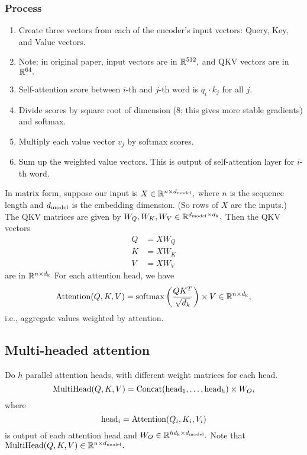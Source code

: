 \subsubsection{Process}
\begin{enumerate}
\item Create three vectors from each of the encoder’s input vectors: Query, Key, and Value vectors.

\item Note: in original paper, input vectors are in $\mathbb{R}^{512},$ and QKV vectors are in $\mathbb{R}^{64}.$

\item Self-attention score between $i$-th and $j$-th word is $q_i \cdot k_j$ for all $j.$

\item Divide scores by square root of dimension (8; this gives more stable gradients) and softmax.

\item Multiply each value vector $v_j$ by softmax scores.

\item Sum up the weighted value vectors. This is output of self-attention layer for $i$-th word.
\end{enumerate}
In matrix form, suppose our input is $X \in \mathbb{R}^{n \times d_{\mathrm{model}}},$ where $n$ is the sequence length and $d_{\mathrm{model}}$ is the embedding dimension. (So rows of $X$ are the inputs.) The QKV matrices are given by $W_Q, W_K, W_V \in \mathbb{R}^{d_{\mathrm{model}} \times d_{\mathrm{k}}}.$ Then the QKV vectors
\begin{align*}
    Q &= XW_Q \\
    K &= XW_K \\
    V &= XW_V
\end{align*}
are in $\mathbb{R}^{n \times d_{\mathrm{k}}}$
For each attention head, we have
\[ \operatorname{Attention}(Q,K,V) = \operatorname{softmax}\left(\frac{QK^T}{\sqrt{d_k}}\right) \times V \in \mathbb{R}^{n \times d_{\mathrm{k}}}, \]
i.e., aggregate values weighted by attention.

\subsection{Multi-headed attention}
Do $h$ parallel attention heads, with different weight matrices for each head.
\[ \operatorname{MultiHead}(Q, K, V) = \operatorname{Concat}(\operatorname{head}_1, \ldots, \operatorname{head}_h) \times W_O, \]
where
\[ \operatorname{head}_i = \operatorname{Attention}(Q_i, K_i, V_i) \]
is output of each attention head and $W_O \in \mathbb{R}^{hd_{\mathrm{k}} \times d_{\mathrm{model}}}.$ Note that $\operatorname{MultiHead}(Q, K, V) \in \mathbb{R}^{n \times d_{\mathrm{model}}}.$ 

